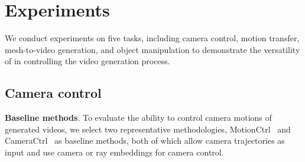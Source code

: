 \section{Experiments}



We conduct experiments on five tasks, including camera control, motion transfer, mesh-to-video generation, and object manipulation to demonstrate the versatility of \methodname in controlling the video generation process. 





\subsection{Camera control}

\textbf{Baseline methods}. To evaluate the ability to control camera motions of generated videos, we select two representative methodologies, MotionCtrl~\cite{wang2024motionctrl} and CameraCtrl~\cite{he2024cameractrl} as baseline methods, both of which allow camera trajectories as input and use camera or ray embeddings for camera control.

